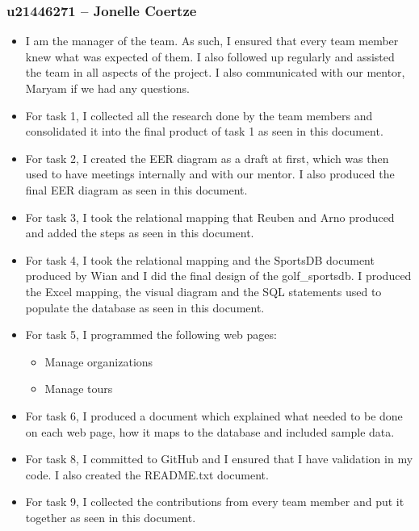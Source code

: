 \documentclass[titlepage]{article}
\begin{document}
\subsubsection*{u21446271 – Jonelle Coertze}
\vspace{1em}
\begin{itemize}
  \item I am the manager of the team. As such, I ensured that every team member knew what was expected of them. I also 
        followed up regularly and assisted the team in all aspects of the project. I also communicated with our mentor,
        Maryam if we had any questions.
  \item For task 1, I collected all the research done by the team members and consolidated it into the final product
        of task 1 as seen in this document.
  \item For task 2, I created the EER diagram as a draft at first, which was then used to have meetings internally
        and with our mentor. I also produced the final EER diagram as seen in this document.
  \item For task 3, I took the relational mapping that Reuben and Arno produced and added the steps as seen in this document.
  \item For task 4, I took the relational mapping and the SportsDB document produced by Wian and I did the final design of
        the golf\_sportsdb. I produced the Excel mapping, the visual diagram and the SQL statements used to populate the
        database as seen in this document.
  \item For task 5, I programmed the following web pages:
  \begin{itemize}
    \item Manage organizations
    \item Manage tours 
  \end{itemize}
  \item For task 6, I produced a document which explained what needed to be done on each web page, how it maps to the
        database and included sample data.
  \item For task 8, I committed to GitHub and I ensured that I have validation in my code. I also created the README.txt document.
  \item For task 9, I collected the contributions from every team member and put it together as seen in this document.
\end{itemize}

\vspace{1em}
\end{document}
